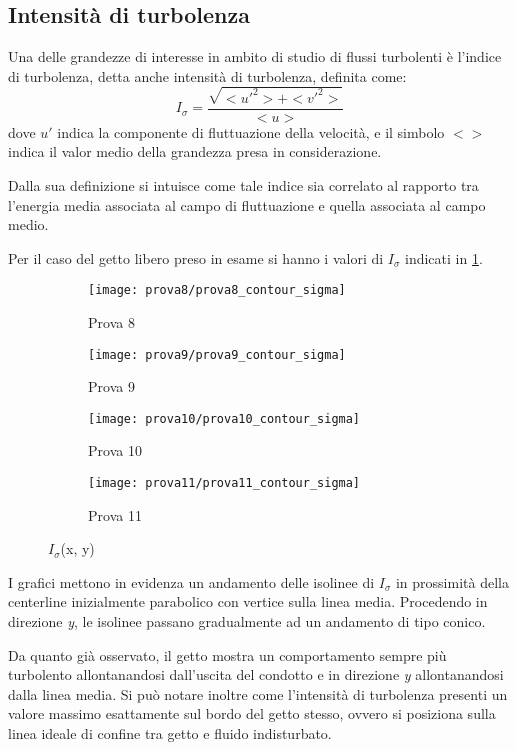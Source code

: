 \documentclass{article} %
\begin{document}
\subsection{Intensità di turbolenza}
Una delle grandezze di interesse in ambito di studio di flussi turbolenti è l'indice di turbolenza, detta anche intensità di turbolenza, definita come:
$$I_{\sigma} = \dfrac{\sqrt{<u'^{2}>+<v'^{2}>}}{<u>}$$
dove $u'$ indica la componente di fluttuazione della velocità, e il simbolo $<>$ indica il valor medio della grandezza presa in considerazione.\par
Dalla sua definizione si intuisce come tale indice sia correlato al rapporto tra l'energia media associata al campo di fluttuazione e quella associata al campo medio.\par
Per il caso del getto libero preso in esame si hanno i  valori di $I_{\sigma}$ indicati in \cref{fig:contour_sigma_8901}.
\begin{figure}[h!]
	\centering
	\begin{subfigure}[b]{0.24\textwidth}
		\texttt{[image: prova8/prova8\_contour\_sigma]}
		\caption{Prova 8}
	\end{subfigure}
	\begin{subfigure}[b]{0.24\textwidth}
		\texttt{[image: prova9/prova9\_contour\_sigma]}
		\caption{Prova 9}
	\end{subfigure}
	\begin{subfigure}[b]{0.24\textwidth}
		\texttt{[image: prova10/prova10\_contour\_sigma]}
		\caption{Prova 10}
	\end{subfigure}
	\begin{subfigure}[b]{0.24\textwidth}
		\texttt{[image: prova11/prova11\_contour\_sigma]}
		\caption{Prova 11}
	\end{subfigure}
	\caption{$I_\sigma$(x, y)}
	\label{fig:contour_sigma_8901}
\end{figure}\par
I grafici mettono in evidenza un andamento delle isolinee di $I_{\sigma}$ in prossimità della centerline inizialmente parabolico con vertice sulla linea media. Procedendo in direzione \textit{y}, le isolinee passano gradualmente ad un andamento di tipo conico.\par
Da quanto già osservato, il getto mostra un comportamento sempre più turbolento allontanandosi dall'uscita del condotto e in direzione \textit{y} allontanandosi dalla linea media. Si può notare inoltre come l'intensità di turbolenza presenti un valore massimo esattamente sul bordo del getto stesso, ovvero si posiziona sulla linea ideale di confine tra getto e fluido indisturbato.\par
\end{document}
